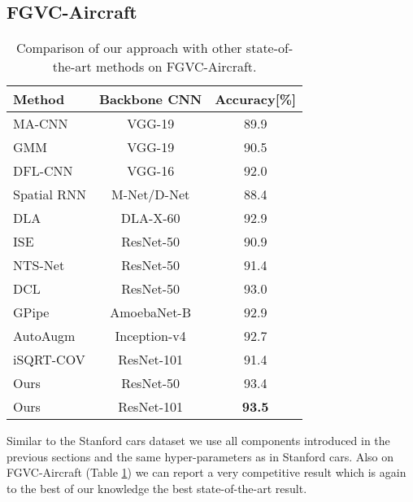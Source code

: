 \documentclass[10pt,twocolumn,letterpaper]{article}
\begin{document}
\subsection{FGVC-Aircraft}
\label{section:aircraft}
\begin{table}[h]
  \begin{center}
  \begin{tabular} {|l|c|c|}
    \hline
    Method & Backbone CNN & Accuracy[\%] \\
    \hline
    \hline
    MA-CNN \cite{zheng2017learning} & VGG-19 &  89.9 \\
    GMM \cite{liang2018gmm} & VGG-19 &  90.5 \\
    DFL-CNN \cite{wang2018learning} & VGG-16 &  92.0 \\
    Spatial RNN \cite{wu2018deep} & M-Net/D-Net & 88.4\\
    DLA \cite{yu2018deep} & DLA-X-60 &  92.9 \\
    ISE \cite{simonelli2018increasingly} & ResNet-50 &  90.9 \\
    NTS-Net \cite{yang2018learning} & ResNet-50 & 91.4 \\
    DCL \cite{Chen_2019_CVPR} & ResNet-50 & 93.0 \\
    GPipe \cite{huang2018gpipe} & AmoebaNet-B & 92.9 \\
    AutoAugm \cite{cubuk2018autoaugment} & Inception-v4 & 92.7 \\
    iSQRT-COV \cite{li2018towards} & ResNet-101 & 91.4 \\
    \hline
    Ours   & ResNet-50  &  93.4 \\
    Ours   & ResNet-101 &  \bf{93.5} \\
    \hline
  \end{tabular}
  \end{center}
  \caption{Comparison of our approach with other state-of-the-art methods on FGVC-Aircraft.}
  \label{table:aircraft}
\end{table}

Similar to the Stanford cars dataset we use all components introduced in the previous sections and the same hyper-parameters as in Stanford cars. Also on FGVC-Aircraft (Table \ref{table:aircraft}) we can report a very competitive result which is again to the best of our knowledge the best state-of-the-art result.
\end{document}

